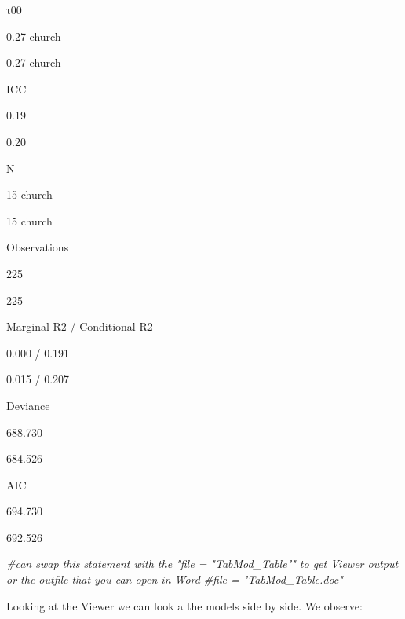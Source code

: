 \documentclass[
  english,
]{book}
\newenvironment{Shaded}{\begin{snugshade}}{\end{snugshade}}
\newcommand{\CommentTok}[1]{\textcolor[rgb]{0.56,0.35,0.01}{\textit{#1}}}
\begin{document}
τ00

0.27 church

0.27 church

ICC

0.19

0.20

N

15 church

15 church

Observations

225

225

Marginal R2 / Conditional R2

0.000 / 0.191

0.015 / 0.207

Deviance

688.730

684.526

AIC

694.730

692.526

\begin{Shaded}
\begin{Highlighting}[]
\CommentTok{\#can swap this statement with the "file = "TabMod\_Table"" to get Viewer output or the outfile that you can open in Word}
\CommentTok{\#file = "TabMod\_Table.doc"}
\end{Highlighting}
\end{Shaded}

Looking at the Viewer we can look a the models side by side. We observe:
\end{document}
